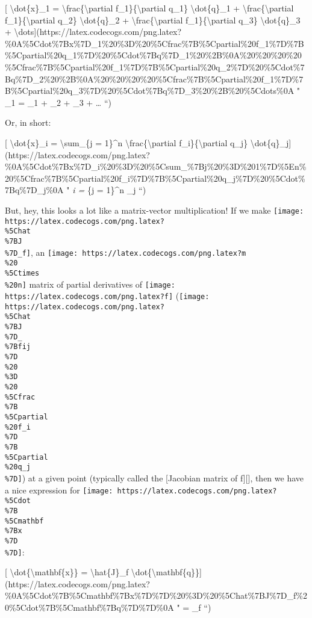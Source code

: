\documentclass[]{article}
\begin{document}
{[} \textbackslash{}dot\{x\}\_1 = \textbackslash{}frac\{\textbackslash{}partial
f\_1\}\{\textbackslash{}partial q\_1\} \textbackslash{}dot\{q\}\_1 +
\textbackslash{}frac\{\textbackslash{}partial f\_1\}\{\textbackslash{}partial
q\_2\} \textbackslash{}dot\{q\}\_2 +
\textbackslash{}frac\{\textbackslash{}partial f\_1\}\{\textbackslash{}partial
q\_3\} \textbackslash{}dot\{q\}\_3 +
\textbackslash{}dots{]}(https://latex.codecogs.com/png.latex?\%0A\%5Cdot\%7Bx\%7D\_1\%20\%3D\%20\%5Cfrac\%7B\%5Cpartial\%20f\_1\%7D\%7B\%5Cpartial\%20q\_1\%7D\%20\%5Cdot\%7Bq\%7D\_1\%20\%2B\%0A\%20\%20\%20\%20\%5Cfrac\%7B\%5Cpartial\%20f\_1\%7D\%7B\%5Cpartial\%20q\_2\%7D\%20\%5Cdot\%7Bq\%7D\_2\%20\%2B\%0A\%20\%20\%20\%20\%5Cfrac\%7B\%5Cpartial\%20f\_1\%7D\%7B\%5Cpartial\%20q\_3\%7D\%20\%5Cdot\%7Bq\%7D\_3\%20\%2B\%20\%5Cdots\%0A
" \_1 =  \_1 +
 \_2 + 
\_3 + \dots
``)

Or, in short:

{[} \textbackslash{}dot\{x\}\_i = \textbackslash{}sum\_\{j = 1\}\^{}n
\textbackslash{}frac\{\textbackslash{}partial f\_i\}\{\textbackslash{}partial
q\_j\}
\textbackslash{}dot\{q\}\_j{]}(https://latex.codecogs.com/png.latex?\%0A\%5Cdot\%7Bx\%7D\_i\%20\%3D\%20\%5Csum\_\%7Bj\%20\%3D\%201\%7D\%5En\%20\%5Cfrac\%7B\%5Cpartial\%20f\_i\%7D\%7B\%5Cpartial\%20q\_j\%7D\%20\%5Cdot\%7Bq\%7D\_j\%0A
" \emph{i = \sum}\{j = 1\}\^{}n 
\_j ``)

But, hey, this looks a lot like a matrix-vector multiplication! If we make
\texttt{[image: https://latex.codecogs.com/png.latex?\\\%5Chat\\\%7BJ\\\%7D\_f]}, an
\texttt{[image: https://latex.codecogs.com/png.latex?m\\\%20\\\%5Ctimes\\\%20n]}
matrix of partial derivatives of
\texttt{[image: https://latex.codecogs.com/png.latex?f]}
(\texttt{[image: https://latex.codecogs.com/png.latex?\\\%5Chat\\\%7BJ\\\%7D\_\\\%7Bfij\\\%7D\\\%20\\\%3D\\\%20\\\%5Cfrac\\\%7B\\\%5Cpartial\\\%20f\_i\\\%7D\\\%7B\\\%5Cpartial\\\%20q\_j\\\%7D]})
at a given point (typically called the {[}Jacobian matrix of f{]}{[}{]}, then we
have a nice expression for
\texttt{[image: https://latex.codecogs.com/png.latex?\\\%5Cdot\\\%7B\\\%5Cmathbf\\\%7Bx\\\%7D\\\%7D]}:

{[} \textbackslash{}dot\{\textbackslash{}mathbf\{x\}\} =
\textbackslash{}hat\{J\}\_f
\textbackslash{}dot\{\textbackslash{}mathbf\{q\}\}{]}(https://latex.codecogs.com/png.latex?\%0A\%5Cdot\%7B\%5Cmathbf\%7Bx\%7D\%7D\%20\%3D\%20\%5Chat\%7BJ\%7D\_f\%20\%5Cdot\%7B\%5Cmathbf\%7Bq\%7D\%7D\%0A
"  = \_f  ``)
\end{document}
